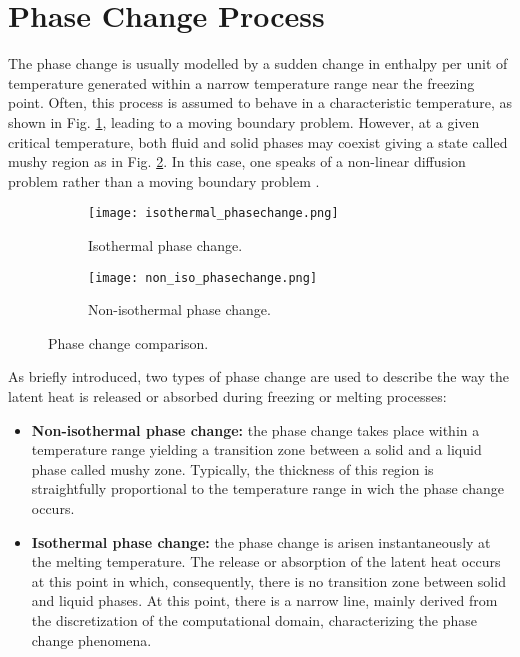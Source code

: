 \clearpage
\section{Phase Change Process}
\setlength{\parindent}{0.5cm} The phase change is usually modelled by a sudden change in enthalpy per unit of temperature generated within a narrow temperature range near the freezing point. Often, this process is assumed to behave in a characteristic temperature, as shown in Fig. \ref{1.5figa}, leading to a moving boundary problem. However, at a given critical temperature, both fluid and solid phases may coexist giving a state called mushy region as in Fig. \ref{1.5figb}. In this case, one speaks of a non-linear diffusion problem rather than a moving boundary problem \cite{krabbenhoft_damkilde_nazem_2006}. 
 
\begin{figure}[h!]
	\begin{subfigure}{0.50\textwidth}
		\centering
		\texttt{[image: isothermal\_phasechange.png]}\hfill
		\caption{Isothermal phase change.} 
		\label{1.5figa}
	\end{subfigure}
	\hfill
	\begin{subfigure}{0.50\textwidth}
		\centering
		\texttt{[image: non\_iso\_phasechange.png]}	
		\caption{Non-isothermal phase change.}
		\label{1.5figb}
	\end{subfigure}
\caption{Phase change comparison.}
\label{1.5fig}
\end{figure}

\noindent As briefly introduced, two types of phase change are used to describe the way the latent heat is released or absorbed during freezing or melting processes:
\begin{itemize}
	\item \textbf{Non-isothermal phase change:} the phase change takes place within a temperature range yielding a transition zone between a solid and a liquid phase called mushy zone. Typically, the thickness of this region is straightfully proportional to the temperature range in wich the phase change occurs.
	\item \textbf{Isothermal phase change:} the phase change is arisen instantaneously at the melting temperature. The release or absorption of the latent heat occurs at this point in which, consequently, there is no transition zone between solid and liquid phases. At this point, there is a narrow line, mainly derived from the discretization of the computational domain, characterizing the phase change phenomena.
\end{itemize}

